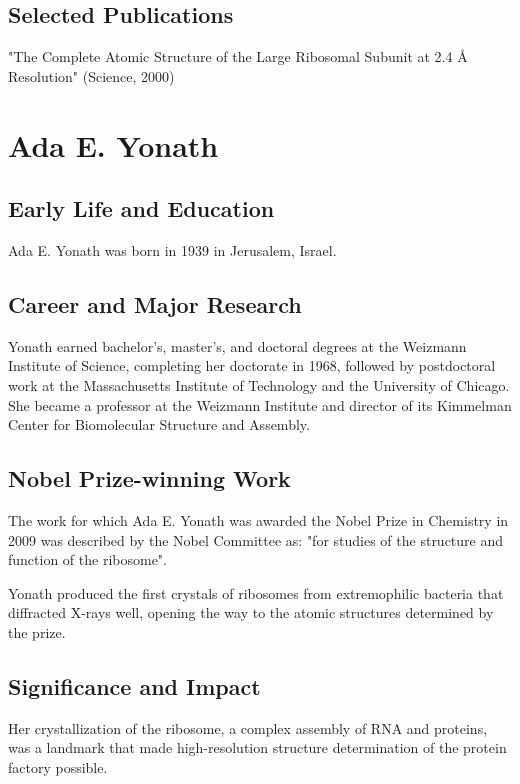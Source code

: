 \subsection*{Selected Publications}

"The Complete Atomic Structure of the Large Ribosomal Subunit at 2.4 Å Resolution" (Science, 2000)

\clearpage

\section{Ada E. Yonath}

\subsection*{Early Life and Education}

Ada E. Yonath was born in 1939 in Jerusalem, Israel.

\subsection*{Career and Major Research}

Yonath earned bachelor's, master's, and doctoral degrees at the Weizmann Institute of Science, completing her doctorate in 1968, followed by postdoctoral work at the Massachusetts Institute of Technology and the University of Chicago. She became a professor at the Weizmann Institute and director of its Kimmelman Center for Biomolecular Structure and Assembly.

\subsection*{Nobel Prize-winning Work}

The work for which Ada E. Yonath was awarded the Nobel Prize in Chemistry in 2009 was described by the Nobel Committee as: "for studies of the structure and function of the ribosome".

Yonath produced the first crystals of ribosomes from extremophilic bacteria that diffracted X-rays well, opening the way to the atomic structures determined by the prize.

\subsection*{Significance and Impact}

Her crystallization of the ribosome, a complex assembly of RNA and proteins, was a landmark that made high-resolution structure determination of the protein factory possible.

